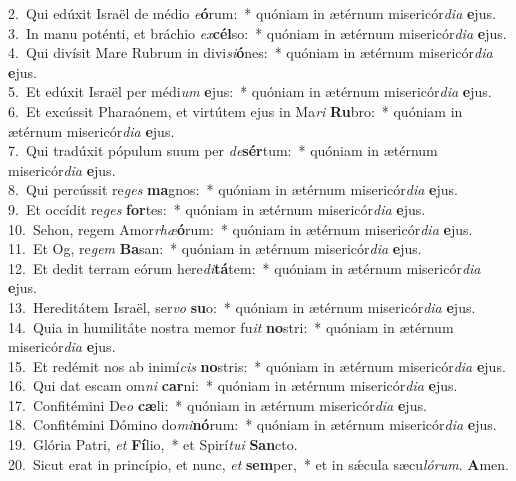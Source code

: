 {2.~}Qui edúxit Israël de médio \textit{e}\textbf{ó}rum:~* quóniam in ætérnum misericór\textit{di}\textit{a} \textbf{e}jus.\\
{3.~}In manu poténti, et bráchio \textit{ex}\textbf{cél}so:~* quóniam in ætérnum misericór\textit{di}\textit{a} \textbf{e}jus.\\
{4.~}Qui divísit Mare Rubrum in divi\textit{si}\textbf{ó}nes:~* quóniam in ætérnum misericór\textit{di}\textit{a} \textbf{e}jus.\\
{5.~}Et edúxit Israël per médi\textit{um} \textbf{e}jus:~* quóniam in ætérnum misericór\textit{di}\textit{a} \textbf{e}jus.\\
{6.~}Et excússit Pharaónem, et virtútem ejus in Ma\textit{ri} \textbf{Ru}bro:~* quóniam in ætérnum misericór\textit{di}\textit{a} \textbf{e}jus.\\
{7.~}Qui tradúxit pópulum suum per \textit{de}\textbf{sér}tum:~* quóniam in ætérnum misericór\textit{di}\textit{a} \textbf{e}jus.\\
{8.~}Qui percússit re\textit{ges} \textbf{ma}gnos:~* quóniam in ætérnum misericór\textit{di}\textit{a} \textbf{e}jus.\\
{9.~}Et occídit re\textit{ges} \textbf{for}tes:~* quóniam in ætérnum misericór\textit{di}\textit{a} \textbf{e}jus.\\
{10.~}Sehon, regem Amor\textit{rhæ}\textbf{ó}rum:~* quóniam in ætérnum misericór\textit{di}\textit{a} \textbf{e}jus.\\
{11.~}Et Og, re\textit{gem} \textbf{Ba}san:~* quóniam in ætérnum misericór\textit{di}\textit{a} \textbf{e}jus.\\
{12.~}Et dedit terram eórum here\textit{di}\textbf{tá}tem:~* quóniam in ætérnum misericór\textit{di}\textit{a} \textbf{e}jus.\\
{13.~}Hereditátem Israël, ser\textit{vo} \textbf{su}o:~* quóniam in ætérnum misericór\textit{di}\textit{a} \textbf{e}jus.\\
{14.~}Quia in humilitáte nostra memor fu\textit{it} \textbf{no}stri:~* quóniam in ætérnum misericór\textit{di}\textit{a} \textbf{e}jus.\\
{15.~}Et redémit nos ab inimí\textit{cis} \textbf{no}stris:~* quóniam in ætérnum misericór\textit{di}\textit{a} \textbf{e}jus.\\
{16.~}Qui dat escam om\textit{ni} \textbf{car}ni:~* quóniam in ætérnum misericór\textit{di}\textit{a} \textbf{e}jus.\\
{17.~}Confitémini De\textit{o} \textbf{cæ}li:~* quóniam in ætérnum misericór\textit{di}\textit{a} \textbf{e}jus.\\
{18.~}Confitémini Dómino do\textit{mi}\textbf{nó}rum:~* quóniam in ætérnum misericór\textit{di}\textit{a} \textbf{e}jus.\\
{19.~}Glória Patri, \textit{et} \textbf{Fí}lio,~* et Spirí\textit{tu}\textit{i} \textbf{San}cto.\\
{20.~}Sicut erat in princípio, et nunc, \textit{et} \textbf{sem}per,~* et in sǽcula sæcu\textit{ló}\textit{rum}. \textbf{A}men.\\
